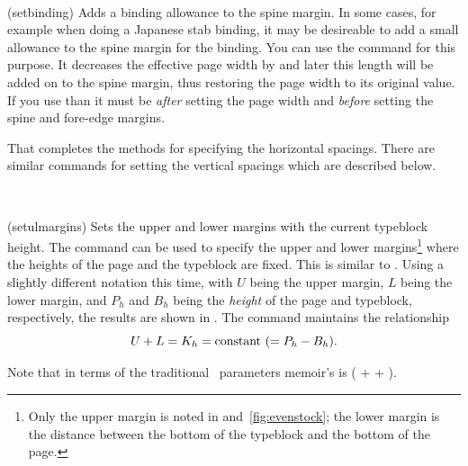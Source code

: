 \begin{syntax}
\cmd{\setbinding} \\
\end{syntax}
\glossary(setbinding)%
  {}%
  {Adds a binding allowance to the spine margin.}
In some cases, for example when doing a Japanese stab binding, it may be 
desireable to add a small allowance 
to the spine margin for the binding.
You can use the command \cmd{\setbinding} for this purpose. It decreases the
effective page width by  and later this length will be added
on to the spine margin, thus restoring the page width to its original value.
If you use \cmd{\setbinding} than it must be \emph{after} setting the page 
width and \emph{before} setting the spine and fore-edge margins.

    That completes the methods for specifying the horizontal spacings. There 
are similar commands for setting the vertical spacings which are 
described below.

\begin{syntax}
\cmd{\setulmargins} \\
\end{syntax}
\glossary(setulmargins)%
  {}%
  {Sets the upper and lower margins with the current typeblock height.}
The command \cmd{\setulmargins} can be used to 
specify
the upper and lower margins\footnote{Only the upper margin is noted in
 and~\ref{fig:evenstock}; 
the lower margin is the distance between the bottom
of the typeblock and the bottom of the page.} 
where the heights of the page and the 
typeblock are 
fixed. This is similar to \cmd{\setlrmargins}. Using a slightly 
different notation this time, with $U$ being the upper 
margin, $L$ being the lower margin, 
and $P_{h}$ and $B_{h}$ being the 
\emph{height} of the page and 
typeblock, respectively, 
the results are shown in .
The \cmd{\setulmargins} command maintains the relationship
\begin{displaymath}
U + L = K_{h}  = \textrm{constant} \mbox{\space} (= P_{h} - B_{h}).
\end{displaymath}

    Note that in terms of the traditional \ltx\ parameters memoir's 
\lnc{\uppermargin} is (\lnc{\topmargin} + \lnc{\headheight} + \lnc{\headsep}).

